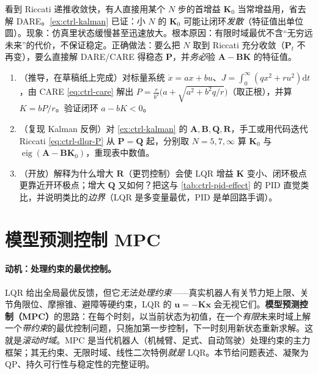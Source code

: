 \begin{pitfall}
看到 Riccati 递推收敛快，有人直接用某个 $N$ 步的首增益 $\mathbf{K}_0$ 当常增益用，省去解 DARE。\cref{ex:ctrl-kalman} 已证：小 $N$ 的 $\mathbf{K}_0$ 可能让闭环\emph{发散}（特征值出单位圆）。现象：仿真里状态缓慢甚至迅速放大。根本原因：有限时域最优不含“无穷远未来”的代价，不保证稳定。正确做法：要么把 $N$ 取到 Riccati 充分收敛（$\mathbf{P}_t$ 不再变），要么直接解 DARE/CARE 得稳态 $\mathbf{P}$，并\emph{务必}验 $\mathbf{A}-\mathbf{B}\mathbf{K}$ 的特征值。
\end{pitfall}

\begin{practice}
\begin{enumerate}
  \item （推导，在草稿纸上完成）对标量系统 $\dot x=ax+bu$、$J=\int_0^\infty(qx^2+ru^2)\mathrm dt$，由 CARE \cref{eq:ctrl-care} 解出 $P=\frac{r}{b^2}\big(a+\sqrt{a^2+b^2q/r}\big)$（取正根），并算 $K=bP/r$。验证闭环 $a-bK<0$。
  \item （复现 Kalman 反例）对 \cref{ex:ctrl-kalman} 的 $\mathbf{A},\mathbf{B},\mathbf{Q},\mathbf{R}$，手工或用代码迭代 Riccati \cref{eq:ctrl-dlqr-P} 从 $\mathbf{P}=\mathbf{Q}$ 起，分别取 $N=5,7,\infty$ 算 $\mathbf{K}_0$ 与 $\operatorname{eig}(\mathbf{A}-\mathbf{B}\mathbf{K}_0)$，重现表中数值。
  \item （开放）解释为什么增大 $\mathbf{R}$（更罚控制）会使 LQR 增益 $\mathbf{K}$ 变小、闭环极点更靠近开环极点；增大 $\mathbf{Q}$ 又如何？把这与 \cref{tab:ctrl-pid-effect} 的 PID 直觉类比，并说明类比的\emph{边界}（LQR 是多变量最优，PID 是单回路手调）。
\end{enumerate}
\end{practice}

\section{模型预测控制 MPC}
\label{sec:ctrl-mpc}

\paragraph{动机：处理约束的最优控制。}
LQR 给出全局最优反馈，但它\emph{无法处理约束}——真实机器人有关节力矩上限、关节角限位、摩擦锥、避障等硬约束，LQR 的 $\mathbf{u}=-\mathbf{K}\mathbf{x}$ 会无视它们。\textbf{模型预测控制（MPC）}的思路：在每个时刻，以当前状态为初值，在一个\emph{有限}未来时域上解一个\emph{带约束}的最优控制问题，只施加第一步控制，下一时刻用新状态重新求解。这就是\emph{滚动时域}。MPC 是当代机器人（机械臂、足式、自动驾驶）处理约束的主力框架；其无约束、无限时域、线性二次特例\emph{就是} LQR。本节给问题表述、凝聚为 QP、持久可行性与稳定性的完整证明。

